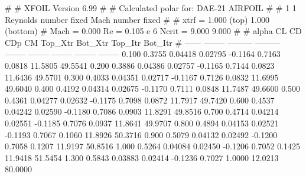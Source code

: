 #  
#       XFOIL         Version 6.99
#  
# Calculated polar for: DAE-21 AIRFOIL                                  
#  
# 1 1 Reynolds number fixed          Mach number fixed         
#  
# xtrf =   1.000 (top)        1.000 (bottom)  
# Mach =   0.000     Re =     0.105 e 6     Ncrit =   9.000  9.000
#  
#   alpha    CL        CD       CDp       CM     Top_Xtr  Bot_Xtr  Top_Itr  Bot_Itr
#  ------ -------- --------- --------- -------- -------- -------- -------- --------
   0.100   0.3755   0.04418   0.02795  -0.1164   0.7163   0.0818  11.5805  49.5541
   0.200   0.3886   0.04386   0.02757  -0.1165   0.7144   0.0823  11.6436  49.5701
   0.300   0.4033   0.04351   0.02717  -0.1167   0.7126   0.0832  11.6995  49.6040
   0.400   0.4192   0.04314   0.02675  -0.1170   0.7111   0.0848  11.7487  49.6600
   0.500   0.4361   0.04277   0.02632  -0.1175   0.7098   0.0872  11.7917  49.7420
   0.600   0.4537   0.04242   0.02590  -0.1180   0.7086   0.0903  11.8291  49.8516
   0.700   0.4714   0.04214   0.02551  -0.1185   0.7076   0.0937  11.8641  49.9707
   0.800   0.4894   0.04153   0.02521  -0.1193   0.7067   0.1060  11.8926  50.3716
   0.900   0.5079   0.04132   0.02492  -0.1200   0.7058   0.1207  11.9197  50.8516
   1.000   0.5264   0.04084   0.02450  -0.1206   0.7052   0.1425  11.9418  51.5454
   1.300   0.5843   0.03883   0.02414  -0.1236   0.7027   1.0000  12.0213  80.0000
